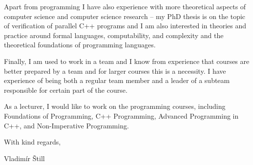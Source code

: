 \documentclass[11pt,a4paper]{article}
\begin{document}
Apart from programming I have also experience with more theoretical aspects of computer science and computer science research -- my PhD thesis is on the topic of verification of parallel C++ programs and I am also interested in theories and practice around formal languages, computability, and complexity and the theoretical foundations of programming languages.

Finally, I am used to work in a team and I know from experience that courses are better prepared by a team and for larger courses this is a necessity.
I have experience of being both a regular team member and a leader of a subteam responsible for certain part of the course.

As a lecturer, I would like to work on the programming courses, including Foundations of Programming, C++ Programming, Advanced Programming in C++, and Non-Imperative Programming.

\smallskip
With kind regards,\par
Vladimír Štill
\end{document}
